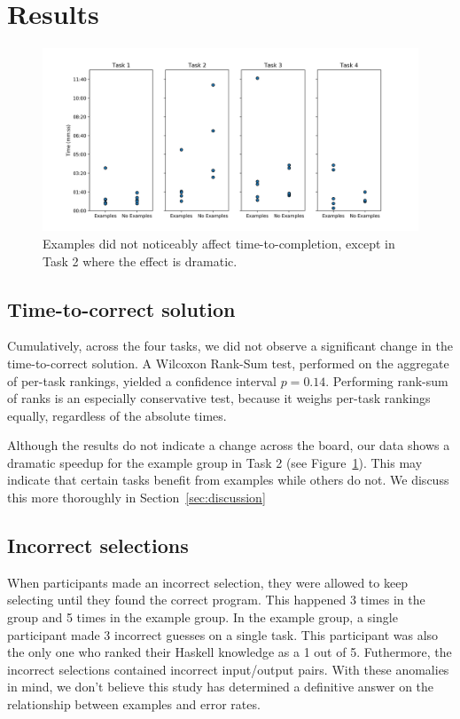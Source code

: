 \section{Results}
\begin{figure}[ht]
  \centering
  \includegraphics[width=\textwidth]{results/task_points.png}
  \caption{
    Examples did not noticeably affect time-to-completion, except in Task 2
    where the effect is dramatic.
  }
  \label{fig:data-points}
\end{figure}
\subsection{Time-to-correct solution}
Cumulatively, across the four tasks, we did not observe a significant change
in the time-to-correct solution.
%
A Wilcoxon Rank-Sum test, performed on the aggregate of per-task rankings,
yielded a confidence interval $p=0.14$.
%
Performing rank-sum of ranks is an especially conservative test, because it weighs
per-task rankings equally, regardless of the absolute times.

Although the results do not indicate a change across the board, our data shows a dramatic
speedup for the example group in Task 2 (see Figure~\ref{fig:data-points}).
%
This may indicate that certain tasks benefit from examples while others do not.
%
We discuss this more thoroughly in Section~\ref{sec:discussion}

\subsection{Incorrect selections}
When participants made an incorrect selection, they were allowed to keep
selecting until they found the correct program.
%
This happened 3 times in the \noexamples group and 5 times in the example group.
%
In the example group, a single participant made 3 incorrect guesses on a
single task.
%
This participant was also the only one who ranked their Haskell knowledge as a 1 out of 5.
%
Futhermore, the incorrect selections contained incorrect input/output pairs. 
%
With these anomalies in mind, we don't believe this study has determined a definitive answer
on the relationship between examples and error rates.

